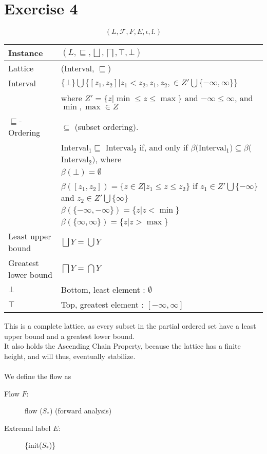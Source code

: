 \section{Exercise 4}
\begin{equation}
  \left(L, \mathcal{F}, F, E, \iota, \mathrm{f}.  \right)
  \label{eq:monotone_framework}
\end{equation}
\begin{table}
\begin{tabular}{| l | l |}
  \hline
  Instance & $(L,\sqsubseteq,\bigsqcup, \bigsqcap, \top, \bot )$ \\
  \hline
  \hline
  Lattice  & (Interval, $\sqsubseteq$) \\
  \hline
  Interval & $\{\bot\} \bigcup \{[z_1, z_2] | z_1 < z_2, z_1, z_2, \in Z' \bigcup \{- \infty, \infty \} \} $ \\
           & where $Z' = \{ z | \min \leq z \leq \max \}$ and $ - \infty \leq \infty $, and $ \min, \max \in Z$ \\
           \hline
   $\sqsubseteq$-Ordering &  $\subseteq$ (subset ordering).\\
                          & Interval$_1 \sqsubseteq $ Interval$_2 $ if, and only if $\beta($Interval$_1) \subseteq \beta($Interval$_2)$, where \\
                          & $\beta(\bot) = \emptyset$ \\
                          & $\beta([z_1, z_2]) = \{ z \in Z | z_1 \leq z \leq z_2\} $ if $z_1 \in Z' \bigcup \{  -\infty\} $ and $ z_2 \in Z' \bigcup \{\infty\}$ \\
                          & $\beta(\{-\infty, -\infty\}) = \{z | z < \min\}$ \\
                          & $\beta(\{\infty, \infty\}) = \{z | z > \max\}$ \\
   \hline
   Least upper bound      & $\bigsqcup Y = \bigcup Y$\\
   \hline
   Greatest lower bound   & $\bigsqcap Y = \bigcap Y$\\
   \hline
   $\bot$                 & Bottom, least element : $\emptyset$\\
   \hline
   $\top$                 & Top, greatest element : $[-\infty, \infty]$\\
\hline   
\end{tabular}
  \centering
\end{table}

This is a complete lattice, as every subset in the partial ordered set have a least upper bound and a greatest lower bound.\\
It also holds the Ascending Chain Property, because the lattice has a finite height, and will thus, eventually stabilize.\\\\
We define the flow as 
\begin{description}
  \item[Flow $F$:] flow ($S_*$) (forward analysis)
  \item[Extremal label $E$:] \{init($S_*$)\}
\end{description}

